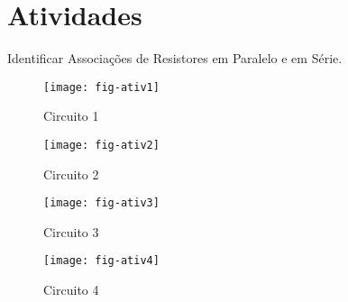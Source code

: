 \section{Atividades}

Identificar Associações de Resistores em Paralelo e em Série.


\begin{minipage}{\linewidth}
  \centering
  \begin{minipage}{0.45\linewidth}
    \begin{figure}[H]
      \centering
      \label{fig:ativ1}
      \caption{Circuito 1}
      \texttt{[image: fig-ativ1]}
    \end{figure}
  \end{minipage}
  \hspace{0.05\linewidth}
  \begin{minipage}{0.45\linewidth}
    \begin{figure}[H]
      \centering
      \label{fig:ativ2}
      \caption{Circuito 2}
      \texttt{[image: fig-ativ2]}
    \end{figure}
  \end{minipage}
\end{minipage}

\begin{minipage}{\linewidth}
  \centering
  \begin{minipage}{0.45\linewidth}
    \begin{figure}[H]
      \centering
      \label{fig:ativ3}
      \caption{Circuito 3}
      \texttt{[image: fig-ativ3]}
    \end{figure}
  \end{minipage}
  \hspace{0.05\linewidth}
  \begin{minipage}{0.45\linewidth}
    \begin{figure}[H]
      \centering
      \label{fig:ativ4}
      \caption{Circuito 4}
      \texttt{[image: fig-ativ4]}
    \end{figure}
  \end{minipage}
\end{minipage}
